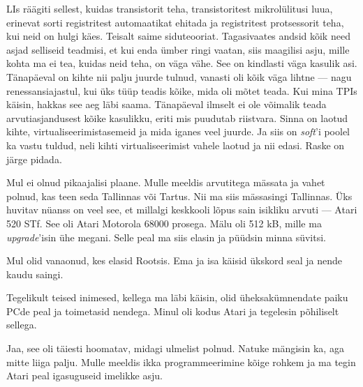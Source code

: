
LIs räägiti sellest, 
kuidas transistorit teha, transistoritest 
mikrolülitusi luua, erinevat sorti 
registritest automaatikat ehitada ja registritest protsessorit teha, kui neid on 
hulgi käes. Teisalt saime siduteooriat. Tagasivaates andsid kõik need asjad selliseid teadmisi, et kui 
enda ümber ringi vaatan, siis maagilisi asju, mille kohta ma ei tea, 
kuidas neid teha, on väga vähe. See on kindlasti väga kasulik asi. Tänapäeval on kihte nii 
palju juurde tulnud, vanasti oli kõik väga lihtne --- nagu 
renessansiajastul, kui üks tüüp teadis kõike, mida oli mõtet teada. 
Kui mina TPIs käisin, hakkas see aeg läbi saama. Tänapäeval ilmselt ei ole võimalik teada arvutiasjandusest kõike 
kasulikku, eriti mis puudutab riistvara. Sinna on laotud kihte, virtualiseerimistasemeid ja mida iganes veel juurde. Ja siis on \emph{soft}'i poolel ka vastu 
tuldud, neli kihti virtualiseerimist vahele laotud ja nii edasi. Raske on järge pidada.


Mul ei olnud pikaajalisi plaane. Mulle meeldis arvutitega mässata ja vahet polnud, kas teen seda Tallinnas või 
Tartus. Nii ma siis mässasingi Tallinnas. Üks huvitav nüanss 
on veel see, et millalgi keskkooli lõpus sain isikliku arvuti --- Atari 520 STf. See
oli Atari Motorola 68000 prosega. Mälu oli 512 kB, mille ma 
\emph{upgrade}'isin ühe megani. Selle peal ma siis elasin ja püüdsin minna süvitsi. 


Mul olid vanaonud, kes elasid Rootsis. Ema ja isa käisid ükskord seal ja nende
kaudu saingi. 


Tegelikult teised inimesed, kellega ma läbi käisin, olid üheksakümnendate paiku PCde peal ja 
toimetasid nendega. Minul oli kodus Atari ja tegelesin 
põhiliselt sellega. 


Jaa, see oli täiesti hoomatav, midagi ulmelist 
polnud. Natuke mängisin ka, aga mitte liiga palju. Mulle meeldis ikka 
programmeerimine kõige rohkem ja ma tegin Atari peal igasuguseid imelikke asju.


